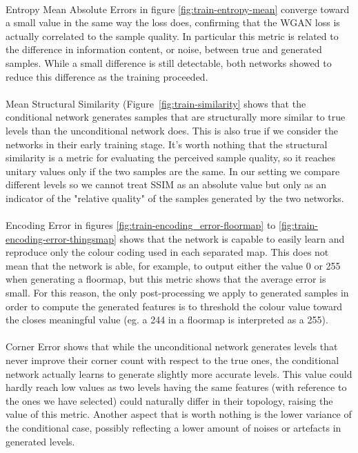 \paragraph{} Entropy Mean Absolute Errors in figure \ref{fig:train-entropy-mean} converge toward a small value in the same way the loss does, confirming that the WGAN loss is actually correlated to the sample quality. In particular this metric is related to the difference in information content, or noise, between true and generated samples. While a small difference is still detectable, both networks showed to reduce this difference as the training proceeded.

\paragraph{} Mean Structural Similarity (Figure~\ref{fig:train-similarity} shows that the conditional network generates samples that are structurally more similar to true levels than the unconditional network does. This is also true if we consider the networks in their early training stage. It's worth nothing that the structural similarity is a metric for evaluating the perceived sample quality, so it reaches unitary values only if the two samples are the same. In our setting we compare different levels so we cannot treat SSIM as an absolute value but only as an indicator of the "relative quality" of the samples generated by the two networks.

\paragraph{} Encoding Error in figures \ref{fig:train-encoding_error-floormap} to \ref{fig:train-encoding-error-thingsmap} shows that the network is capable to easily learn and reproduce only the colour coding used in each separated map. This does not mean that the network is able, for example, to output either the value 0 or 255 when generating a floormap, but this metric shows that the average error is small. For this reason, the only post-processing we apply to generated samples in order to compute the generated features is to threshold the colour value toward the closes meaningful value (eg. a 244 in a floormap is interpreted as a 255). 

\paragraph{} Corner Error shows that while the unconditional network generates levels that never improve their corner count with respect to the true ones, the conditional network actually learns to generate slightly more accurate levels. This value could hardly reach low values as two levels having the same features (with reference to the ones we have selected) could naturally differ in their topology, raising the value of this metric. Another aspect that is worth nothing is the lower variance of the conditional case, possibly reflecting a lower amount of noises or artefacts in generated levels.

